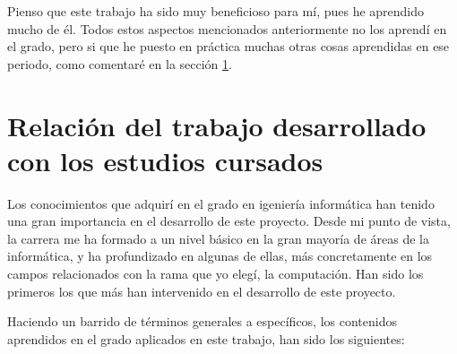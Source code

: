 \documentclass[11pt,spanish,listoffigures]{tfgetsinf}
\begin{document}
Pienso que este trabajo ha sido muy beneficioso para mí, pues he aprendido mucho de él. Todos estos aspectos mencionados anteriormente no los aprendí en el grado, pero si que he puesto en práctica muchas otras cosas aprendidas en ese periodo, como comentaré en la sección \ref{sec:estudios-cursados}.


\section{Relación del trabajo desarrollado con los estudios cursados}
\label{sec:estudios-cursados}

Los conocimientos que adquirí en el grado en igeniería informática han tenido una gran importancia en el desarrollo de este proyecto. Desde mi punto de vista, la carrera me ha formado a un nivel básico en la gran mayoría de áreas de la informática, y ha profundizado en algunas de ellas, más concretamente en los campos relacionados con la rama que yo elegí, la computación. Han sido los primeros los que más han intervenido en el desarrollo de este proyecto.

Haciendo un barrido de términos generales a específicos, los contenidos aprendidos en el grado aplicados en este trabajo, han sido los siguientes: 
\end{document}

